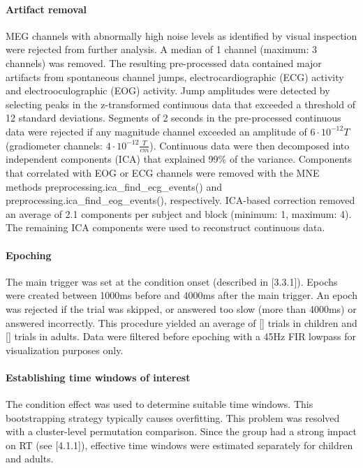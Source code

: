 \paragraph{Artifact removal}
MEG channels with abnormally high noise levels as identified by visual inspection were rejected from further analysis. A median of 1 channel (maximum: 3 channels) was removed.
The resulting pre-processed data contained major artifacts from spontaneous channel jumps, electrocardiographic (ECG) activity and electrooculographic (EOG) activity.
Jump amplitudes were detected by selecting peaks in the z-transformed continuous data that exceeded a threshold of 12 standard deviations.
Segments of 2 seconds in the pre-processed continuous data were rejected if any magnitude channel exceeded an amplitude of $6\cdot10^{-12}T$ (gradiometer channels: $4\cdot10^{-12}\frac{T}{cm}$).
Continuous data were then decomposed into independent components (ICA) that explained 99\% of the variance.
Components that correlated with EOG or ECG channels were removed with the MNE methods preprocessing.ica\_find\_ecg\_events() and preprocessing.ica\_find\_eog\_events(), respectively.
ICA-based correction removed an average of 2.1 components per subject and block (minimum: 1, maximum: 4).
The remaining ICA components were used to reconstruct continuous data.

\paragraph{Epoching}
The main trigger was set at the condition onset (described in [3.3.1]).
Epochs were created between 1000ms before and 4000ms after the main trigger.
An epoch was rejected if the trial was skipped, or answered too slow (more than 4000ms) or answered incorrectly.
This procedure yielded an average of [] trials in children and [] trials in adults.
Data were filtered before epoching with a 45Hz FIR lowpass for visualization purposes only.

\paragraph{Establishing time windows of interest}
The condition effect was used to determine suitable time windows.
This bootstrapping strategy typically causes overfitting.
This problem was resolved with a cluster-level permutation comparison.
Since the group had a strong impact on RT (see [4.1.1]), effective time windows were estimated separately for children and adults.

